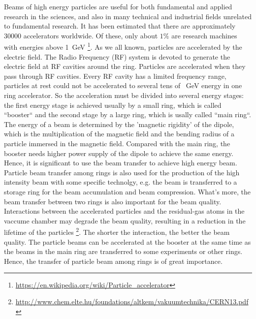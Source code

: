 %

Beams of high energy particles are useful for both fundamental and applied research in the sciences, and also in many technical and industrial fields unrelated to fundamental research. It has been estimated that there are approximately 30000 accelerators worldwide. Of these, only about $1\%$ are research machines with energies above \SI{1}{GeV} \footnote{\url{https://en.wikipedia.org/wiki/Particle_accelerator}}.  As we all known, particles are accelerated by the electric field. The Radio Frequency (RF) system is devoted to generate the electric field at RF cavities around the ring. Particles are accelerated when they pass through RF cavities. Every RF cavity has a limited frequency range,  particles at rest could not be accelerated to several tens of \SI{}{GeV} energy in one ring accelerator.  So the acceleration must be divided into several energy stages: the first energy stage is achieved usually by a small ring, which is called ``booster`` and the second stage by a large ring, which is usally called ``main ring``.  The energy of a beam is determined by the 'magnetic rigidity' of the dipole, which is the multiplication of the magnetic field and the bending radius of a particle immersed in the magnetic field. Compared with the main ring, the booster needs higher power supply of the dipole to achieve the same energy. Hence, it is significant to use  the beam transfer to achieve high energy beam. Particle beam transfer among rings is also used for the production of the high intensity beam with some specific technolgy, e.g. the beam is transferred to a storage ring for the beam accumulation and beam compression. What's more, the beam transfer between two rings is also important for the beam quality.  Interactions  between  the accelerated particles and the residual-gas atoms in the vaccume chamber may degrade the beam quality, resulting in a reduction in the lifetime of the particles \footnote{\url{http://www.chem.elte.hu/foundations/altkem/vakuumtechnika/CERN13.pdf}}. The shorter the interaction, the better the beam quality. The particle beams can be accelerated at the booster at the same time as the beams in the main ring are transferred to some experiments or other rings. Hence, the transfer of particle beam among rings is of great importance.
